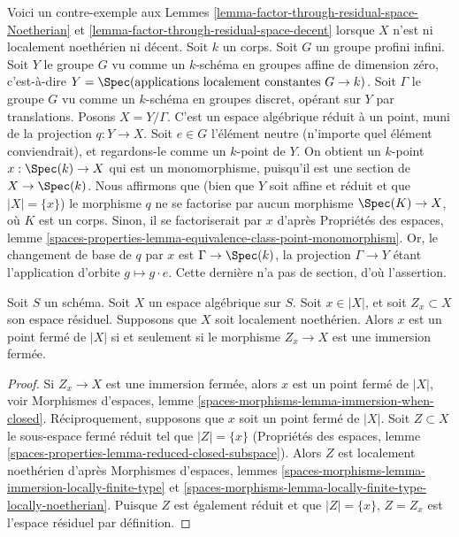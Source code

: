 \begin{example}
\label{example-does-not-factor-through-residual-gerbe}
Voici un contre-exemple aux
Lemmes \ref{lemma-factor-through-residual-space-Noetherian} et
\ref{lemma-factor-through-residual-space-decent}
lorsque $X$ n'est ni localement noethérien ni décent.
Soit $k$ un corps. Soit $G$ un groupe profini infini.
Soit $Y$ le groupe $G$ vu comme un $k$-schéma en groupes affine de
dimension zéro, c'est-à-dire
$Y = \Spec(\text{applications localement constantes } G \to k)$.
Soit $\Gamma$ le groupe $G$ vu comme un $k$-schéma en groupes discret,
opérant sur $Y$ par translations. Posons $X = Y/\Gamma$.
C'est un espace algébrique réduit à un point, muni de la projection
$q : Y \to X$.
Soit $e \in G$ l'élément neutre (n'importe quel élément conviendrait), et
regardons-le comme un $k$-point de $Y$. On obtient un $k$-point
$x : \Spec(k) \to X$ qui est un monomorphisme, puisqu'il est une section de
$X \to \Spec(k)$.
Nous affirmons que (bien que $Y$ soit affine et réduit et que
$|X| = \{x\}$) le morphisme $q$ ne se factorise par aucun morphisme
$\Spec(K) \to X$, où $K$ est un corps. Sinon, il se factoriserait par
$x$ d'après Propriétés des espaces, lemme
\ref{spaces-properties-lemma-equivalence-class-point-monomorphism}.
Or, le changement de base de $q$ par $x$ est $\Gamma \to \Spec(k)$, la
projection $\Gamma \to Y$ étant l'application d'orbite
$g \mapsto g \cdot e$. Cette dernière n'a pas de section, d'où l'assertion.
\end{example}

\begin{lemma}
\label{lemma-residual-space-closed}
Soit $S$ un schéma. Soit $X$ un espace algébrique sur $S$. Soit
$x \in |X|$, et soit $Z_x \subset X$ son espace résiduel. Supposons que $X$
soit localement noethérien. Alors $x$ est un point fermé de $|X|$ si et
seulement si le morphisme $Z_x \to X$ est une immersion fermée.
\end{lemma}

\begin{proof}
Si $Z_x \to X$ est une immersion fermée, alors $x$ est un point fermé de
$|X|$, voir Morphismes d'espaces, lemme
\ref{spaces-morphisms-lemma-immersion-when-closed}.
Réciproquement, supposons que $x$ soit un point fermé de $|X|$.
Soit $Z \subset X$ le sous-espace fermé réduit tel que $|Z| = \{x\}$
(Propriétés des espaces,
lemme \ref{spaces-properties-lemma-reduced-closed-subspace}).
Alors $Z$ est localement noethérien d'après Morphismes d'espaces, lemmes
\ref{spaces-morphisms-lemma-immersion-locally-finite-type} et
\ref{spaces-morphisms-lemma-locally-finite-type-locally-noetherian}.
Puisque $Z$ est également réduit et que $|Z| = \{x\}$, $Z = Z_x$ est
l'espace résiduel par définition.
\end{proof}











